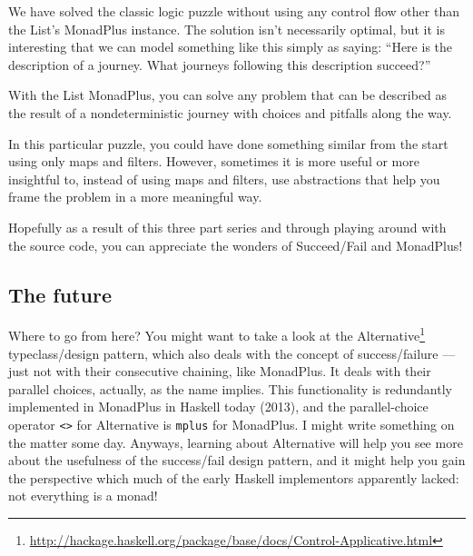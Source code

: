 \documentclass[]{article}
\renewcommand{\href}[2]{#2\footnote{\url{#1}}}
\begin{document}
We have solved the classic logic puzzle without using any control flow other
than the List's MonadPlus instance. The solution isn't necessarily optimal, but
it is interesting that we can model something like this simply as saying: ``Here
is the description of a journey. What journeys following this description
succeed?''

With the List MonadPlus, you can solve any problem that can be described as the
result of a nondeterministic journey with choices and pitfalls along the way.

In this particular puzzle, you could have done something similar from the start
using only maps and filters. However, sometimes it is more useful or more
insightful to, instead of using maps and filters, use abstractions that help you
frame the problem in a more meaningful way.

Hopefully as a result of this three part series and through playing around with
the source code, you can appreciate the wonders of Succeed/Fail and MonadPlus!

\subsection{The future}\label{the-future}

Where to go from here? You might want to take a look at the
\href{http://hackage.haskell.org/package/base/docs/Control-Applicative.html}{Alternative}
typeclass/design pattern, which also deals with the concept of success/failure
--- just not with their consecutive chaining, like MonadPlus. It deals with
their parallel choices, actually, as the name implies. This functionality is
redundantly implemented in MonadPlus in Haskell today (2013), and the
parallel-choice operator \texttt{\textless{}\textbar{}\textgreater{}} for
Alternative is \texttt{mplus} for MonadPlus. I might write something on the
matter some day. Anyways, learning about Alternative will help you see more
about the usefulness of the success/fail design pattern, and it might help you
gain the perspective which much of the early Haskell implementors apparently
lacked: not everything is a monad!
\end{document}

